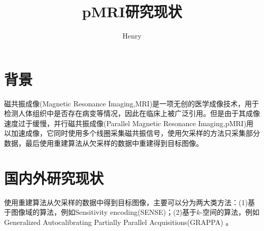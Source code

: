 \documentclass[11pt]{article}
\title{pMRI研究现状}
\author{Henry}
\begin{document}
	\maketitle 
	
	\section{背景}
	\par 磁共振成像(Magnetic Resonance Imaging,MRI)是一项无创的医学成像技术，用于检测人体组织中是否存在病变等情况，因此在临床上被广泛引用。但是由于其成像速度过于缓慢，并行磁共振成像(Parallel Magnetic Resonance Imaging,pMRI)用以加速成像，它同时使用多个线圈采集磁共振信号，使用欠采样的方法只采集部分数据，最后使用重建算法从欠采样的数据中重建得到目标图像。
	\section{国内外研究现状}
	\par 使用重建算法从欠采样的数据中得到目标图像，主要可以分为两大类方法：(1)基于图像域的算法，例如Sensitivity encoding(SENSE)\cite{pruessmann1999sense}；(2)基于$k$-空间的算法，例如Generalized Autocalibrating Partially Parallel Acquisitions(GRAPPA) \cite{griswold2002generalized}。
		
\end{document}
